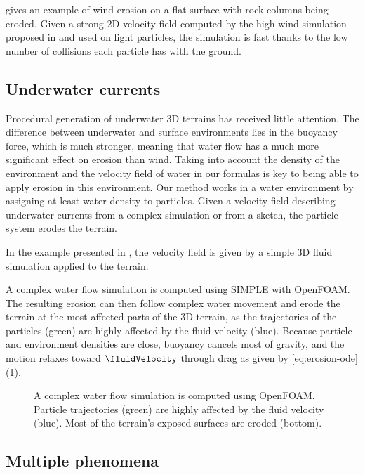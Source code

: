  gives an example of wind erosion on a flat surface with rock columns being eroded. Given a strong 2D velocity field computed by the high wind simulation proposed in \cite{Paris2019b} and used on light particles, the simulation is fast thanks to the low number of collisions each particle has with the ground. 

\subsection{Underwater currents}

Procedural generation of underwater 3D terrains has received little attention. The difference between underwater and surface environments lies in the buoyancy force, which is much stronger, meaning that water flow has a much more significant effect on erosion than wind. Taking into account the density of the environment and the velocity field of water in our formulas is key to being able to apply erosion in this environment.  
Our method works in a water environment by assigning at least water density to particles. Given a velocity field describing underwater currents from a complex simulation or from a sketch, the particle system erodes the terrain. 

In the example presented in , the velocity field is given by a simple 3D fluid simulation \cite{Stam1999} applied to the terrain.

A complex water flow simulation is computed using SIMPLE \cite{Caretto1973} with OpenFOAM. The resulting erosion can then follow complex water movement and erode the terrain at the most affected parts of the 3D terrain, as the trajectories of the particles (green) are highly affected by the fluid velocity (blue). Because particle and environment densities are close, buoyancy cancels most of gravity, and the motion relaxes toward $\fluidVelocity$ through drag as given by \cref{eq:erosion-ode} (\cref{fig:erosion-underwater_result}).

\begin{figure}
    \caption{A complex water flow simulation is computed using OpenFOAM. Particle trajectories (green) are highly affected by the fluid velocity (blue). Most of the terrain’s exposed surfaces are eroded (bottom).}
    \label{fig:erosion-underwater_result}
\end{figure}



\subsection{Multiple phenomena} 

